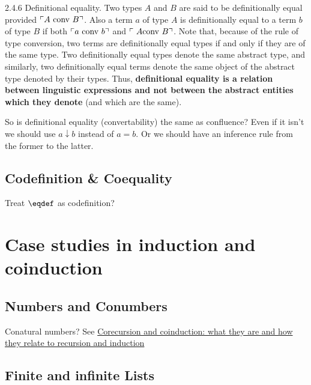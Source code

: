 \documentclass{article}
\begin{document}
\vspace{2ex}

\begin{displayquote} 2.4.6 Definitional equality. Two types \(A\) and \(B\) are
  said to be {\upshape definitionally equal} provided \(\ulcorner
  A\ \text{\upshape conv}\ B\urcorner\). Also a term \(a\) of type
  \(A\) is definitionally equal to a term \(b\) of type \(B\) if both
  \(\ulcorner a\ \text{\upshape conv}\ b\urcorner\) and \(\ulcorner\ A
  \text{\upshape conv}\ B\urcorner\). Note that, because of the rule of type
  conversion, two terms are definitionally equal types if and only if
  they are of the same type. Two definitionally equal types denote the
  same abstract type, and similarly, two definitionally equal terms
  denote the same object of the abstract type denoted by their types.
  Thus, \textbf{definitional equality is a relation between linguistic
    expressions and not between the abstract entities which they
    denote} (and which are the same).
\end{displayquote}

So is definitional equality (convertability) the same as confluence?
Even if it isn't we should use \(a\downarrow b\) instead of \(a = b\).
Or we should have an inference rule from the former to the latter.

\subsection{Codefinition \& Coequality}

Treat \(\defeq\) as codefinition?

\section{Case studies in induction and coinduction}

\subsection{Numbers and Conumbers}

Conatural numbers? See
\href{https://www.cl.cam.ac.uk/archive/mjcg/plans/Coinduction.pdf}{Corecursion
  and coinduction: what they are and how they relate to recursion and
  induction}

\subsection{Finite and infinite Lists}
\end{document}
